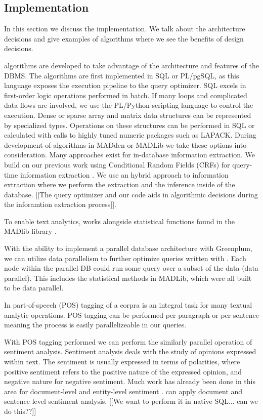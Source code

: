 \subsection{{\system} Implementation}

In this section we discuss the \system implementation. We talk about the 
architecture decisions and give examples of algorithms where we see the
benefits of design decisions.


\system algorithms are developed to take advantage of the architecture and 
features of the DBMS.
The algorithms are first implemented in SQL or PL/pgSQL, as this language
exposes the execution pipeline to the query optimizer. 
SQL excels in first-order logic operations performed in batch.
If many loops and complicated data flows are involved, we use the PL/Python 
scripting language to control the execution.
Dense or sparse array and matrix data structures can be represented
by specialized types. Operations on these structures can be performed in
SQL or calculated with calls to highly tuned numeric packages such as LAPACK.
During development of algorithms in MADden or MADLib we take these options 
into consideration.
Many approaches exist for in-database information extraction. 
We build on our previous work using Conditional Random Fields (CRFs) for 
query-time information extraction \cite{wang2011hybrid}. 
We use an hybrid approach to information extraction where we perform the 
extraction and the inference inside of the database. [[The query optimizer and
our code aids in algorithmic decisions during the inforamtion extraction 
process]].

To enable text analytics, {\system} works alongside statistical
functions found in the MADlib library \cite{Cohen:2009:MSN:1687553.1687576}.

With the ability to implement a parallel database architecture with %
Greenplum, we can utilize data parallelism to further optimize queries written
with {\system}. Each node within the parallel DB could run some query
over a subset of the data (data parallel). This includes the statistical methods
in MADLib, which were all built to be data parallel.

In part-of-speech (POS) tagging of a corpra is an integral task for many 
textual analytic operations. POS tagging can be performed per-paragraph or 
per-sentence meaning the process is easily parallelizeable in our queries.

With POS tagging performed we can perform the similarly parallel operation 
of sentiment analysis.
Sentiment analysis deals with the study of opinions expressed within text. 
The sentiment is usually expressed in terms of polarities, where positive
sentiment refers to the positive nature of the expressed opinion, and negative
nature for negative sentiment. Much work has already been done in this
area for document-level and entity-level sentiment \cite{o2010tweets,
zhang2011combining}. 
{\system} can apply document and sentence level sentiment analysis.
[[We want to perform it in native SQL... can we do this??]]

